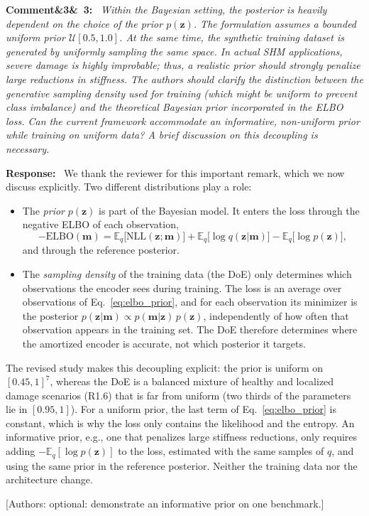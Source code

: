 \documentclass[11pt]{article}
\newenvironment{rcomment}[1]{\par\bigskip\noindent\textbf{Comment\ifx&#1&\else\ #1\fi:}\ \itshape}{\par}
\newenvironment{response}{\par\smallskip\noindent\color{resp}\textbf{Response:}\ }{\par}
\newcommand{\authornote}[1]{\textcolor{note}{\textsf{[Authors: #1]}}}
\newcommand{\m}{\mathbf{m}}
\newcommand{\z}{\mathbf{z}}
\begin{document}
\begin{rcomment}{3}
Within the Bayesian setting, the posterior is heavily dependent on the choice of the prior $p(\z)$. The formulation
assumes a bounded uniform prior $\mathcal{U}[0.5,1.0]$. At the same time, the synthetic training dataset is generated
by uniformly sampling the same space. In actual SHM applications, severe damage is highly improbable; thus, a realistic
prior should strongly penalize large reductions in stiffness. The authors should clarify the distinction between the
generative sampling density used for training (which might be uniform to prevent class imbalance) and the theoretical
Bayesian prior incorporated in the ELBO loss. Can the current framework accommodate an informative, non-uniform prior
while training on uniform data? A brief discussion on this decoupling is necessary.
\end{rcomment}

\begin{response}
We thank the reviewer for this important remark, which we now discuss explicitly. Two different distributions play a
role:
\begin{itemize}[leftmargin=*]
\item The \emph{prior} $p(\z)$ is part of the Bayesian model. It enters the loss through the negative ELBO of each
observation,
\begin{equation}
-\mathrm{ELBO}(\m)=\mathbb{E}_q\big[\mathrm{NLL}(\z;\m)\big]+\mathbb{E}_q\big[\log q(\z|\m)\big]
-\mathbb{E}_q\big[\log p(\z)\big],
\label{eq:elbo_prior}
\end{equation}
and through the reference posterior.
\item The \emph{sampling density} of the training data (the DoE) only determines which observations the encoder sees
during training. The loss is an average over observations of Eq.~\eqref{eq:elbo_prior}, and for each observation its
minimizer is the posterior $p(\z|\m)\propto p(\m|\z)\,p(\z)$, independently of how often that observation appears in the
training set. The DoE therefore determines where the amortized encoder is accurate, not which posterior it targets.
\end{itemize}
The revised study makes this decoupling explicit: the prior is uniform on $[0.45,1]^7$, whereas the DoE is a balanced
mixture of healthy and localized damage scenarios (R1.6) that is far from uniform (two thirds of the parameters lie in
$[0.95,1]$). For a uniform prior, the last term of Eq.~\eqref{eq:elbo_prior} is constant, which is why the loss only
contains the likelihood and the entropy. An informative prior, e.g., one that penalizes large stiffness reductions,
only requires adding $-\mathbb{E}_q[\log p(\z)]$ to the loss, estimated with the same samples of $q$, and using the same
prior in the reference posterior. Neither the training data nor the architecture change.
\end{response}
\authornote{optional: demonstrate an informative prior on one benchmark.}
\end{document}
